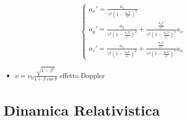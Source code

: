 \documentclass[a4paper]{article}
\begin{document}
\begin{itemize}
                $$\begin{cases}
                    a_x'=\frac{a_x}{\gamma^3\left(1-\frac{u_xV}{c^2}\right)^3}\\
                    a_y'=\frac{a_y}{\gamma^2\left(1-\frac{u_xV}{c^2}\right)^2}+\frac{\frac{u_yV}{c^2}}{\gamma^2\left(1-\frac{u_xV}{c^2}\right)^3}a_x\\
                    a_z'=\frac{a_z}{\gamma^2\left(1-\frac{u_xV}{c^2}\right)^2}+\frac{\frac{u_zV}{c^2}}{\gamma^2\left(1-\frac{u_xV}{c^2}\right)^3}a_x
                \end{cases}$$
            \item $\nu=\nu_0\frac{\sqrt{1-\beta^2}}{1+\beta\cos{\theta}}$ effetto Doppler
        \end{itemize}
    \section{Dinamica Relativistica}
\end{document}
